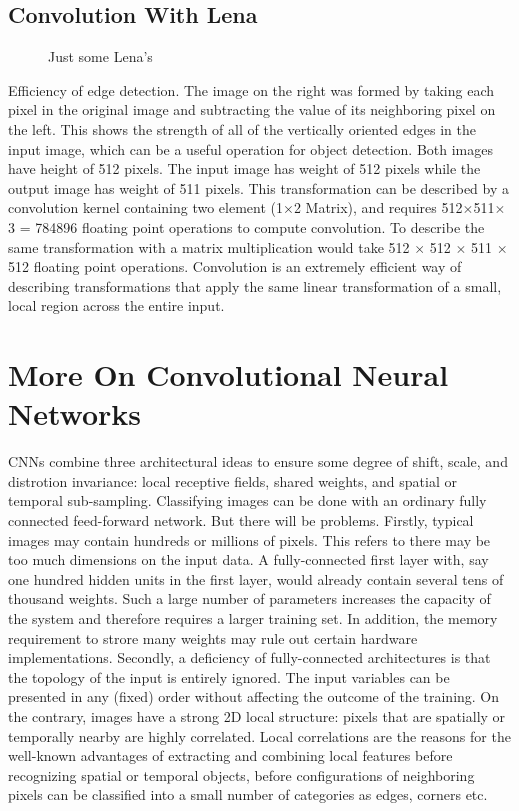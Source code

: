 \documentclass[11pt]{article}
\begin{document}
\subsection{Convolution With Lena}
\begin{figure}[H]
    \centering
    \qquad
    \caption{Just some Lena's}%
    \label{fig:example}
\end{figure}
\hspace*{1cm}Efficiency of edge detection. The image on the right was formed by taking each pixel in the original image and subtracting the value of its neighboring pixel on the left. This shows the strength of all of the vertically oriented edges in the input image, which can be a useful operation for object detection. Both images have height of 512 pixels. The input image has weight of 512 pixels while the output image has weight of 511 pixels. This transformation can be described by a convolution kernel containing two element (1$\times$2 Matrix), and requires 512$\times$511$\times$3 = 784896 floating point operations to compute convolution. To describe the same transformation with a matrix multiplication would take 512 $\times$ 512 $\times$ 511 $\times$ 512 floating point operations. Convolution is an extremely efficient way of describing transformations that apply the same linear transformation of a small, local region across the entire input. 



\section{More On Convolutional Neural Networks}
\hspace*{1cm}CNNs combine three architectural ideas to ensure some degree of shift, scale, and distrotion invariance: local receptive fields, shared weights, and spatial or temporal sub-sampling. Classifying images can be done with an ordinary fully connected feed-forward network. But there will be problems. Firstly, typical images may contain hundreds or millions of pixels. This refers to there may be too much dimensions on the input data. A fully-connected first layer with, say one hundred hidden units in the first layer, would already contain several tens of thousand weights. Such a large number of parameters increases the capacity of the system and therefore requires a larger training set. In addition, the memory requirement to strore many weights may rule out certain hardware implementations. Secondly, a deficiency of fully-connected architectures is that the topology of the input is entirely ignored. The input variables can be presented in any (fixed) order without affecting the outcome of the training. On the contrary, images have a strong 2D local structure: pixels that are spatially or temporally nearby are highly correlated. Local correlations are the reasons for the well-known advantages of extracting and combining local features before recognizing spatial or temporal objects, before configurations of neighboring pixels can be classified into a small number of categories as edges, corners etc. \cite{lecun1998gradient}
\end{document}
